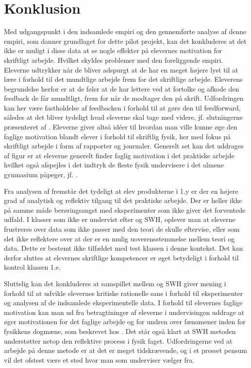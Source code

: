 \chapter{Konklusion}
\label{Ch:6}

Med udgangspunkt i den indsamlede empiri og den gennemførte analyse af denne empiri, som danner grundlaget for dette pilot projekt, kan det konkluderes at det ikke er muligt i disse data at se nogle effekter på elevernes motivation for skriftligt arbejde. Hvilket skyldes problemer med den foreliggende empiri. Eleverne udtrykker når de bliver adspurgt at de har en meget højere lyst til at lære i forhold til det mundtlige arbejde frem for det skriftlige arbejde. Eleverens begrundelse herfor er at de føler at de har lettere ved at fortolke og afkode den feedback de får mundtligt, frem for når de modtager den på skrift. Udfordringen kan her være fastholdelse af feedbacken i forhold til at gøre den til feedforward, således at det bliver tydeligt hvad eleverne skal tage med videre, jf. slutningerne præsenteret af \citet{Hattie2015}. Eleverne giver altså idéer til hvordan man ville kunne øge den faglige motivation blandt elever i forhold til skriftlig fysik, her med fokus på skriftligt arbejde i form af rapporter og journaler. Generelt set kan det uddrages af figur  er at eleverne generelt finder faglig motivation i det praktiske arbejde hvilket også afspejles i det indtryk de fleste fysik undervisere i det almene gymnasium påpeger, jf. \citep{Krogh2016}.

Fra analysen af fremstår det tydeligt at elev produkterne i 1.y er der en højere grad af analytisk og reflektiv tilgang til det praktiske arbejde. Der er heller ikke på samme måde berøringsangst med eksperimenter som ikke giver det forventede udfald. I klasser som ikke er undervist efter \ib{} og SWH, oplever man at eleverne frustreres over data som ikke passer med den teori de skulle eftervise, eller som slet ikke reflektere over at der er en mulig uoverensstemmelse mellem teori og data. Dette er bestemt ikke tilfældet med test klassen i denne kontekst. Det kan derfor sluttes at elevernes skriftlige kompetencer er øget betydeligt i forhold til kontrol klassen 1.e.

Sluttelig kan det konkluderes at samspillet mellem \ib{} og SWH giver mening i forhold til at udvikle elevernes kritiske rationelle sans i forhold til eksperimenter og analysen af de indsamlede eksperimentelle data. I forhold til elevernes faglige motivation kan man ud fra betragtininger af eleverne i undervisingen uddrage at \ib{} øger motivationen for det faglige arbejde og for undren over fænomener inden for fysikkens dogmæne, som beskrevet hos \citet{Dolin2014}. Det står også klart at SWH metoden understøtter netop den reflektive process i fysik faget. Udfordringerne ved at arbejde på denne metode er at det er meget tidskrævende, og i et presset pensum vil det ofstest være et sted hvor man som underviser vælger fra. \bigskip


